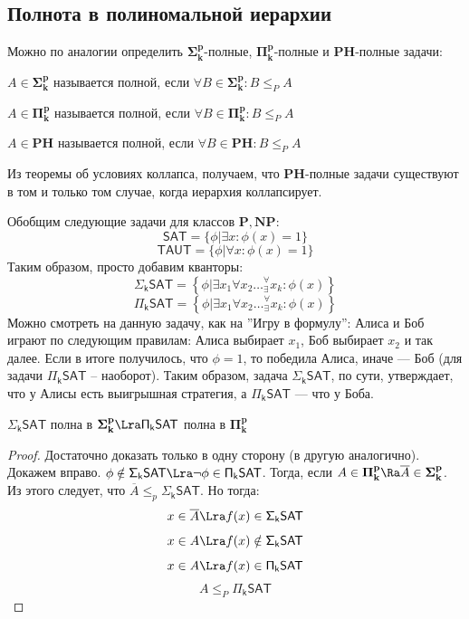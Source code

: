\subsection{Полнота в полиномальной иерархии}

Можно по аналогии определить \(\mathbf{\Sigma_k^p}\)-полные, \(\mathbf{\Pi_k^p}\)-полные и \(\mathbf{PH}\)-полные задачи:

\begin{definition}
    \(A \in \mathbf{\Sigma_k^p}\) называется полной, если \(\forall B \in \mathbf{\Sigma_k^p}: B \le_P A\)
\end{definition}

\begin{definition}
    \(A \in \mathbf{\Pi_k^p}\) называется полной, если \(\forall B \in \mathbf{\Pi_k^p}: B \le_P A\)
\end{definition}

\begin{definition}
    \(A \in \mathbf{PH}\) называется полной, если \(\forall B \in \mathbf{PH}: B \le_P A\)
\end{definition}

\begin{note}
    Из теоремы об условиях коллапса, получаем, что \(\mathbf{PH}\)-полные задачи существуют в том и только том случае, когда иерархия коллапсирует.
\end{note}



Обобщим следующие задачи для классов \(\mathbf{P}, \mathbf{NP}\):
\[\mathsf{SAT} = \{\phi | \exists x: \phi(x) = 1\}\]
\[\mathsf{TAUT} = \{\phi | \forall x: \phi(x) = 1\}\]
Таким образом, просто добавим кванторы:
\[\mathsf{\Sigma_kSAT} = \left\{\phi |  \exists x_1\forall x_2 \dots^\forall_\exists x_k: \phi(x)\right\}\]
\[\mathsf{\Pi_kSAT} = \left\{\phi |  \exists x_1\forall x_2 \dots^\forall_\exists x_k: \phi(x)\right\}\]
Можно смотреть на данную задачу, как на ''Игру в формулу'': Алиса и Боб играют по следующим правилам: Алиса выбирает \(x_1\), Боб выбирает \(x_2\) и так далее. Если в итоге получилось, что \(\phi = 1\), то победила Алиса, иначе --- Боб (для задачи \(\mathsf{\Pi_kSAT}\) -- наоборот). Таким образом, задача \(\mathsf{\Sigma_kSAT}\), по сути, утверждает, что у Алисы есть выигрышная стратегия, а \(\mathsf{\Pi_kSAT}\) --- что у Боба.

\begin{lemma}
    \(\mathsf{\Sigma_kSAT}\) полна в \(\mathbf{\Sigma_k^p} \Lra \mathsf{\Pi_kSAT}\) полна в \(\mathbf{\Pi_k^p}\)
\end{lemma}
\begin{proof}
    Достаточно доказать только в одну сторону (в другую аналогично). Докажем вправо. \(\phi \notin \mathsf{\Sigma_kSAT} \Lra \neg \phi \in \mathsf{\Pi_kSAT}\). Тогда, если \(A \in \mathbf{\Pi_k^p} \Ra \overline{A} \in \mathbf{\Sigma_k^p}\). Из этого следует, что \(\overline{A} \le_p \mathsf{\Sigma_kSAT}\). Но тогда:
    \[x \in \overline{A} \Lra f(x) \in \mathsf{\Sigma_kSAT}\]
    \[x \in A \Lra f(x) \notin \mathsf{\Sigma_kSAT}\]
    \[x \in A \Lra f(x) \in \mathsf{\Pi_kSAT}\]
    \[A \le_P \mathsf{\Pi_kSAT}\]
\end{proof}

